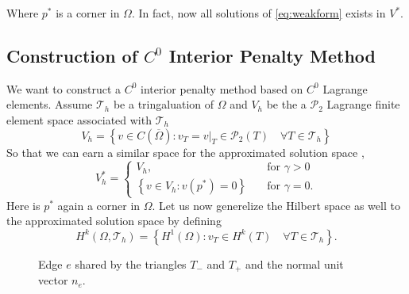 Where $p^{*}$  is a corner in $\Omega $. In fact, now all solutions of \eqref{eq:weakform} exists in $V^{*}$.


\subsection{Construction of $C^{0}$ Interior Penalty Method}%
\label{sub:construction_interior_penalty_method}

We want to construct a $C^{0}$ interior penalty method based on $C^{0}$ Lagrange elements.
Assume $\mathcal{T}_{h} $ be a tringaluation of $\Omega $ and $V_{h}$ be the a $\mathcal{P}_{2} $ Lagrange finite
element space associated with $\mathcal{T}_{h} $ \[
V_{h} = \left\{ v \in C\left( \overline{\Omega } \right) : v_{T} = v |_{T} \in \mathcal{P}_{2}\left( T \right) \quad
\forall T \in  \mathcal{T} _{h}  \right\}
\]
So that we can earn a similar space for the approximated solution space ,
\[
V_{h}^{*} = \begin{cases}
    V_{h}, \quad & \text{for } \gamma >0\\
    \left\{ v \in V_{h}: v\left( p^{*} \right) = 0 \right\} \quad & \text{for } \gamma = 0.
\end{cases}
\]
Here is $p^{*}$ again a corner in $\Omega $. Let us now generelize the Hilbert space as well to the approximated
solution space by defining \[
H^{k}\left( \Omega , \mathcal{T} _{h}  \right) = \left\{ H^{1}\left( \Omega  \right): v_{T} \in H^{k}\left( T
\right)\quad \forall T \in \mathcal{T} _{h} \right\}.
\]
\begin{figure}[!h]
\centering
{}
\caption{Edge $e$ shared by the triangles $T_{-}$ and $T_{+}$ and the normal unit vector $n_{e}$.  }
    \label{fig:normal}
\end{figure}

